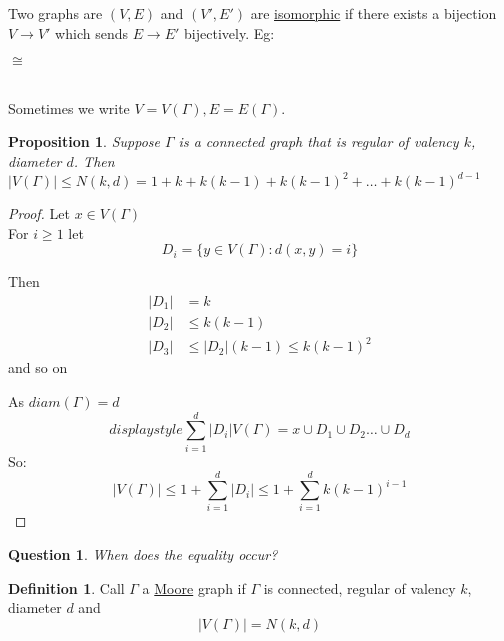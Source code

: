 \documentclass[]{article}
\newtheorem{prop}[thm]{Proposition}
\newtheorem*{quest}{Question}
\theoremstyle{definition}
\newtheorem*{defn}{Definition}
\theoremstyle{remark}
\numberwithin{equation}{section}
\begin{document}
	Two graphs are $(V,E)$ and $(V', E')$ are \underline{isomorphic} if there exists a bijection $V \rightarrow V'$ which sends $E \rightarrow E'$ bijectively. Eg: \\
	$\cong$
	\\

	Sometimes we write $V= V(\Gamma), E = E(\Gamma)$.

	\begin{prop}
		Suppose $\Gamma$ is a connected graph that is regular of valency $k$, diameter $d$. Then $|V(\Gamma)| \leq N(k,d) = 1 + k +  k(k-1) + k(k-1)^2 + \hdots + k(k-1)^{d-1}$
	\end{prop}
	\begin{proof}
		Let $x \in V(\Gamma)$\\
		For $i \geq 1$ let
		\[
			D_i = \{y\in V(\Gamma): d(x,y) = i\}
		\]

		Then
		\begin{align*}
			|D_1| &= k \\
			|D_2| &\leq k(k-1)\\
			|D_3| &\leq |D_2|(k-1)\leq k(k-1)^2
		\end{align*}
		and so on

		As $diam(\Gamma) = d$
		\[
			displaystyle\sum_{i=1}^{d}|D_i|V(\Gamma) = {x} \cup D_1 \cup D_2 \hdots \cup D_d
		\]
		So:
		\[
			|V(\Gamma)| \leq 1 +\sum_{i=1}^{d}|D_i| \leq 1 + \sum_{i=1}^{d} k(k-1)^{i-1}
		\]
	\end{proof}
	\begin{quest}
		When does the equality occur?
	\end{quest}
	\begin{defn}
		Call $\Gamma$ a \underline{Moore} graph if $\Gamma$ is connected, regular of valency $k$, diameter $d$ and \[|V(\Gamma)| = N(k,d)\]
	\end{defn}
\end{document}
